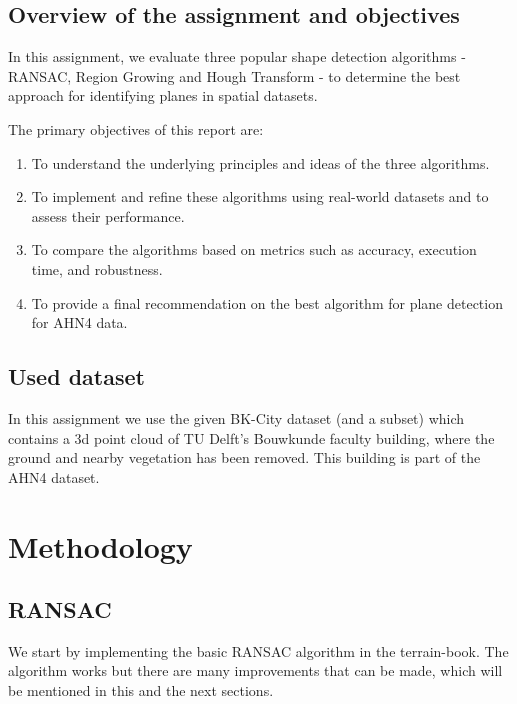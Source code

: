 \documentclass[a4paper,9pt]{article}
\begin{document}
\subsection{Overview of the assignment and objectives}
In this assignment, we evaluate three popular shape detection algorithms - RANSAC, Region Growing and Hough Transform - to determine the best approach for identifying planes in spatial datasets.
\\\par
The primary objectives of this report are:
\begin{enumerate}
    \item To understand the underlying principles and ideas of the three algorithms.
    \item To implement and refine these algorithms using real-world datasets and to assess their performance.
    \item To compare the algorithms based on metrics such as accuracy, execution time, and robustness.
    \item To provide a final recommendation on the best algorithm for plane detection for AHN4 data.
\end{enumerate}


\subsection{Used dataset}
In this assignment we use the given BK-City dataset (and a subset) which contains a 3d point cloud of TU Delft's Bouwkunde faculty building, where the ground and nearby vegetation has been removed. This building is part of the AHN4 dataset.

\newpage


\section{Methodology}
\subsection{RANSAC}
We start by implementing the basic RANSAC algorithm in the terrain-book. The algorithm works but there are many improvements that can be made, which will be mentioned in this and the next sections.
\end{document}
